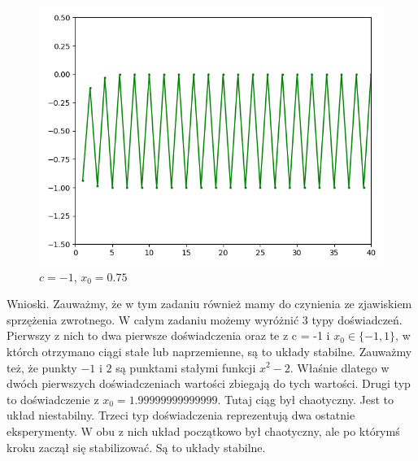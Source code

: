 \documentclass[]{article}
\begin{document}
\begin{figure}[!htbp]
	\includegraphics[scale=1]{task6-10,75}
	\centering
	\caption{$c = -1$, $x_0 = 0.75$}
\end{figure}


Wnioski. Zauważmy, że w tym zadaniu również mamy do czynienia ze zjawiskiem sprzężenia zwrotnego. W całym zadaniu możemy wyróżnić 3 typy doświadczeń. Pierwszy z nich to dwa pierwsze doświadczenia oraz te z c = -1 i $x_0 \in \{-1,1\}$, w którch otrzymano ciągi stałe lub naprzemienne, są to układy stabilne. Zauważmy też, że punkty $-1$ i $2$ są punktami stałymi funkcji $x^2 - 2$. Właśnie dlatego w dwóch pierwszych doświadczeniach wartości zbiegają do tych wartości. Drugi typ to doświadczenie z $x_0 = 1.99999999999999$. Tutaj ciąg był chaotyczny. Jest to układ niestabilny. Trzeci typ doświadczenia reprezentują dwa ostatnie eksperymenty. W obu z nich układ początkowo był chaotyczny, ale po którymś kroku zaczął się stabilizować. Są to układy stabilne.
\end{document}
